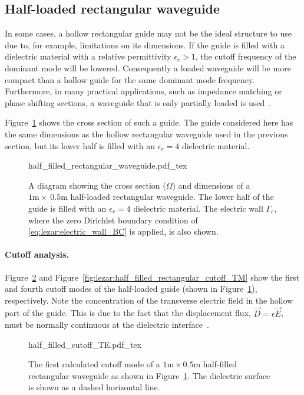 \subsection{Half-loaded rectangular waveguide}

In some cases, a hollow rectangular guide may not be the ideal structure
to use due to, for example, limitations on its dimensions. If the guide
is filled with a dielectric material with a relative permittivity
$\epsilon_r > 1$, the cutoff frequency of the dominant mode will be
lowered. Consequently a loaded waveguide will be more compact than
a hollow guide for the same dominant mode frequency. Furthermore,
in many practical applications, such as impedance matching or phase
shifting sections, a waveguide that is only partially loaded is
used~\citep{Pozar2005}.

Figure~\ref{fig:lezar:half_filled_rectangular_guide} shows the cross
section of such a guide. The guide considered here has the same dimensions
as the hollow rectangular waveguide used in the previous section, but
its lower half is filled with an $\epsilon_r = 4$ dielectric material.
\begin{figure}
    \centering
    \def\svgwidth{\smallfig}
    {half_filled_rectangular_waveguide.pdf_tex}
    \caption{A diagram showing the cross section ($\Omega$)
    and dimensions of a $1\text{m}\times~0.5\text{m}$ half-loaded
    rectangular waveguide. The lower half of the guide is filled with
    an $\epsilon_r = 4$ dielectric material. The electric
    wall $\Gamma_e$, where the zero Dirichlet boundary condition of
    \eqref{eq:lezar:electric_wall_BC} is applied, is also shown.}
    \label{fig:lezar:half_filled_rectangular_guide}
\end{figure}

\paragraph{Cutoff analysis.}

Figure~\ref{fig:lezar:half_filled_rectangular_cutoff_TE} and
Figure~\ref{fig:lezar:half_filled_rectangular_cutoff_TM} show the
first and fourth cutoff modes of the half-loaded guide (shown in
Figure~\ref{fig:lezar:half_filled_rectangular_guide}), respectively. Note
the concentration of the transverse electric field in the hollow part of
the guide. This is due to the fact that the displacement flux, $\vec{D}
= \epsilon\vec{E}$, must be normally continuous at the dielectric
interface~\citep{Pozar2005, Smith1997}.
\begin{figure}
\bwfig
\centering
  \def\svgwidth{\smallfig}
    {half_filled_cutoff_TE.pdf_tex}
\caption{The first calculated cutoff mode of a
$1\text{m}\times0.5\text{m}$ half-filled rectangular waveguide as shown
in Figure~\ref{fig:lezar:half_filled_rectangular_guide}. The dielectric
surface is shown as a dashed horizontal line.}
\label{fig:lezar:half_filled_rectangular_cutoff_TE}
\end{figure}

